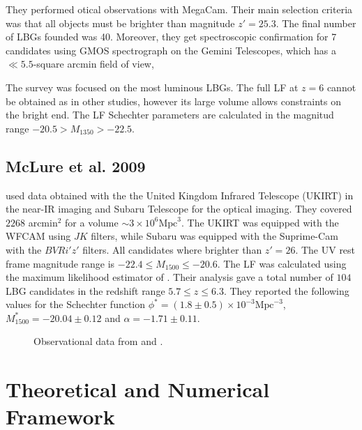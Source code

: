 \documentclass{emulateapj}
\begin{document}
They performed otical observations with MegaCam.
Their main selection criteria was that all objects must be brighter
than magnitude $z' = 25.3$. 
The final  number of LBGs founded was 40. 
Moreover, they get spectroscopic confirmation 
for 7 candidates using GMOS spectrograph on the Gemini Telescopes, which 
has a $\ll 5.5$-square arcmin field of view, 

The survey was focused on the most luminous LBGs. 
The full LF at $z=6$ cannot be obtained as in other studies, however
its large volume allows constraints on the bright end.
The LF Schechter parameters are calculated in the magnitud range 
$-20.5 > M_{1350} > -22.5$.

\subsection{McLure et al. 2009}

\citet{McLure09} used data obtained with the 
the United Kingdom Infrared Telescope (UKIRT) in the near-IR imaging
and Subaru Telescope for the optical imaging. 
They covered $2268$ arcmin$^{2}$  for a volume $\sim 3 \times 10^6 \textrm{Mpc}^3$.
The UKIRT was equipped with the WFCAM using $J K$ filters, while Subaru was 
equipped with the Suprime-Cam with the $B V R i' z'$ filters. 
All candidates  where brighter than $z'=26$. 
The UV rest frame magnitude range is 
$-22.4\leq M_{1500} \leq-20.6$. 
The LF was calculated using the maximum 
likelihood estimator of \citet{Schmidt68}. 
Their analysis gave a total number of 
$104$ LBG candidates in the redshift range $5.7\leq z \leq 6.3$. 
They reported the following values for the Schechter function
$\phi^* =(1.8\pm 0.5)\times 10 ^{-3} \textrm{Mpc}^{-3}$, 
$M^*_{1500} = -20.04\pm 0.12$ and $\alpha = -1.71 \pm 0.11$. 


\begin{figure}
\caption{Observational data from \cite{Bouwens15,McLure09}and \cite{Willott13}.}
\label{graph_observational_data}
\end{figure}


\section{Theoretical and Numerical Framework}
\label{sec:methodology}
\end{document}
